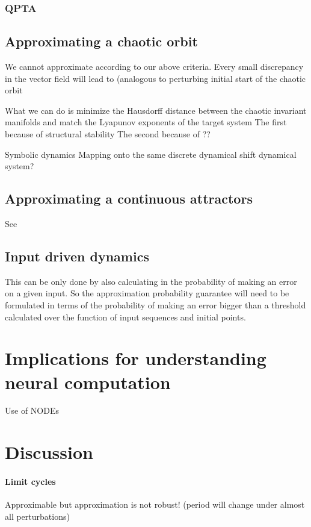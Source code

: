 \documentclass{article}
\theoremstyle{definition}
\theoremstyle{remark}
\begin{document}
\subsubsection{QPTA}
\citep{Park2023a}


\subsection{Approximating a chaotic orbit}
We cannot approximate according to our above criteria.
Every small discrepancy in the vector field will lead to 
(analogous to perturbing initial start of the chaotic orbit 


What we can do is minimize the Hausdorff distance between the chaotic invariant manifolds and match the Lyapunov exponents of the target system
The first because of structural stability
The second because of ??


Symbolic dynamics
Mapping onto the same discrete dynamical shift dynamical system?


\subsection{Approximating a continuous attractors}

See \citep{Sagodi2024a}


\subsection{Input driven dynamics}

This can be only done by also calculating in the probability of making an error on a given input.
So the approximation probability guarantee will need to be formulated in terms of the probability of making an error bigger than a threshold calculated over the function of input sequences and initial points.


\section{Implications for understanding neural computation}

Use of NODEs \citep{kim2021inferring}




\section{Discussion}


\paragraph{Limit cycles}
Approximable but approximation is not robust! (period will change under almost all perturbations)
\end{document}
